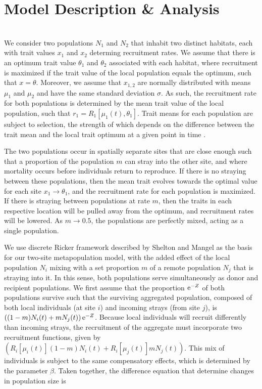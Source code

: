 \documentclass{revtex4}
\begin{document}
\section{Model Description \& Analysis}

\\
\noindent We consider two populations $N_1$ and $N_2$ that inhabit two distinct habitats, each with trait values $x_1$ and $x_2$ determing recruitment rates.
We assume that there is an optimum trait value $\theta_1$ and $\theta_2$ associated with each habitat, where recruitment is maximized if the trait value of the local population equals the optimum, such that $x = \theta$.
Moreover, we assume that $x_{1,2}$ are normally distributed with means $\mu_1$ and $\mu_2$ and have the same standard deviation $\sigma$.
As such, the recruitment rate for both populations is determined by the mean trait value of the local population, such that $r_1 = R_1[\mu_1(t),\theta_1]$.
Trait means for each population are subject to selection, the strength of which depends on the difference between the trait mean and the local trait optimum at a given point in time \citep{simpson1953major,Lande:1976ga}.

The two populations occur in spatially separate sites that are close enough such that a proportion of the population $m$ can stray into the other site, and where mortality occurs before individuals return to reproduce.
If there is no straying between these populations, then the mean trait evolves towards the optimal value for each site $x_1 \rightarrow \theta_1$, and the recruitment rate for each population is maximized.
If there is straying between populations at rate $m$, then the traits in each respective location will be pulled away from the optimum, and recruitment rates will be lowered.
As $m \rightarrow 0.5$, the populations are perfectly mixed, acting as a single population.


We use discrete Ricker framework described by Shelton and Mangel \citep{Shelton:2011eq} as the basis for our two-site metapopulation model, with the added effect of the local population $N_i$ mixing with a set proportion $m$ of a remote population $N_j$ that is straying into it.
In this sense, both populations serve simultaneously as donor and recipient populations.
We first assume that the proportion ${\rm e}^{-Z}$ of both populations survive such that the surviving aggregated population, composed of both local individuals (at site $i$) and incoming strays (from site $j$), is $\left((1-m)N_i(t) + m N_j(t) \right){\rm e}^{-Z}$.
Because local individuals will recruit differently than incoming strays, the recruitment of the aggregate must incorporate two recruitment functions, given by $\left(R_i[\mu_i(t)] (1-m)N_i(t) + R_i[\mu_j(t)] m N_j(t)\right)$.
This mix of individuals is subject to the same compensatory effects, which is determined by the parameter $\beta$.
Taken together, the difference equation that determine changes in population size is
\end{document}
